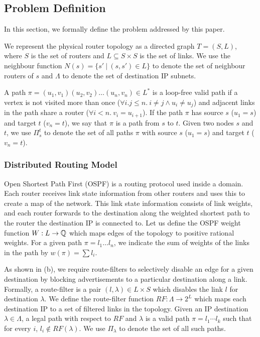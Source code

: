 \subsection{Problem Definition}
In this section, we formally define the problem addressed by this paper.

We represent the physical router topology as a directed graph $T=(S, L)$,
where $S$ is the set of routers and $L\subseteq S\times S$ is the set of links. 
We use the neighbour function $N(s) = \{s'\ | \ (s,s') \in L \}$ to denote 
the set of neighbour routers of $s$ and
$\Lambda$  to denote the set of destination IP subnets.

A path $\pi = (u_1,v_1) (u_2, v_2) \ldots (u_n, v_n) \in L^*$ is a loop-free valid path if
a  vertex is not visited more than once ($\forall i.j \leq n. 
~i \not= j \wedge u_i \not= u_j$) and adjacent links in the
path share a router ($\forall i < n. ~v_i = u_{i+1}$).
If the path $\pi$ has source $s$ ($u_1=s$) and target $t$ ($v_n=t$),
we say that $\pi$ is a path from $s$ to $t$.
Given two nodes $s$ and $t$, we use $\Pi_s^t$ to denote the set of all paths
$\pi$ with source $s$ ($u_1=s$) and target $t$ ($v_n=t$).

\subsubsection{Distributed Routing Model}
Open Shortest Path First (OSPF) is a routing protocol used inside a
domain. Each router receives link state information from other routers
and uses this to create a map of the network. This link state
information consists of link weights, and each router
forwards to the destination along the weighted shortest path 
to the router the destination IP is connected to. 
Let us
define the OSPF weight function $W: L \rightarrow \mathbb{Q}$ which 
maps edges of the topology to positive rational weights. 
For a given
path $\pi=l_1\ldots l_n$, we indicate the sum of weights of the
links in the path by $w(\pi)=\sum l_i$. 


As shown in (b), 
we require  route-filters
to selectively disable an
edge for a given destination by  
blocking advertisements to a
particular destination along a link. 
Formally, a route-filter is a pair $(l,\lambda)\in L\times S$
which disables the link $l$ for destination $\lambda$. 
We define the route-filter function 
$RF: \Lambda \rightarrow 2^L$ which maps each destination IP
to a set of filtered links in the topology. 
Given an IP destination $\lambda\in \Lambda$, 
a legal path with respect to $RF$ and $\lambda$
is a valid path $\pi=l_1\cdots l_k$ such that for every $i$,
$l_i\not\in RF(\lambda)$.
We use $\Pi_\lambda$ to denote the set of all such paths.


